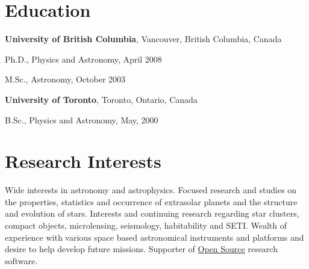 \documentclass[margin,line]{res}
\newenvironment{list1}{
  \begin{list}{\ding{113}}{%
      \setlength{\itemsep}{0in}
      \setlength{\parsep}{0in} \setlength{\parskip}{0in}
      \setlength{\topsep}{0in} \setlength{\partopsep}{0in} 
      \setlength{\leftmargin}{0.17in}}}{\end{list}}
\begin{document}
\begin{resume}
\vspace*{-.1in}

\section{\sc Education}
{\bf University of British Columbia}, Vancouver, British Columbia, Canada\\
\vspace*{-.15in}
\begin{list1}
\item[] Ph.D., Physics and Astronomy, April 2008
\item[] M.Sc., Astronomy,  October 2003
\end{list1}
\vspace*{-.15in}
{\bf University of Toronto}, Toronto, Ontario, Canada\\
\vspace*{-.15in}
\begin{list1}
\item[] B.Sc., Physics and Astronomy,  May, 2000
\end{list1}

\vspace*{-.1in}

\section{\sc Research Interests}
Wide interests in astronomy and astrophysics.  Focused research and studies on the properties, statistics and occurrence of extrasolar planets and the structure and evolution of stars.  Interests and continuing research regarding star clusters, compact objects, microlensing, seismology, habitability and SETI.  Wealth of experience with various space based astronomical instruments and platforms and desire to help develop future missions.  Supporter of \href{https://github.com/jasonfrowe}{Open Source} research software.  

\vspace*{-.1in}


\end{resume}
\end{document}
